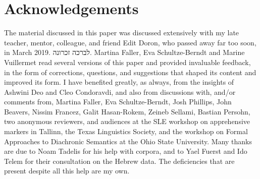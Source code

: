 \documentclass[output=paper,colorlinks,citecolor=brown]{langscibook}
\begin{document}
\section*{Acknowledgements}
The material discussed in this paper was discussed extensively with my late teacher, mentor, colleague, and friend Edit Doron, who passed away far too soon, in March 2019. \foreignlanguage{hebrew}{לברכה}
\foreignlanguage{hebrew}{זכרונה}.
Martina Faller, Eva Schultze-Berndt and Marine Vuillermet read several versions of this paper and provided invaluable feedback, in the form of corrections, questions, and suggestions that shaped its content and improved its form. I have benefited greatly, as always, from the insights of Ashwini Deo and Cleo Condoravdi, and also from discussions with, and/or comments from, Martina Faller, Eva Schultze-Berndt, Josh Phillips, John Beavers, Nissim Francez, Galit Hasan-Rokem, Zeineb Sellami, Bastian Persohn, two anonymous reviewers, and audiences at the SLE workshop on apprehensive markers in Tallinn,  the Texas Linguistics Society, and the workshop on Formal Approaches to Diachronic Semantics at the Ohio State University. Many thanks are due to Noam Tadelis for his help with corpora, and to Yael Fuerst and Ido Telem for their consultation on the Hebrew data. The deficiencies that are present despite all this help are my own. 

\printbibliography[heading=subbibliography,notkeyword=this]
\end{document}
